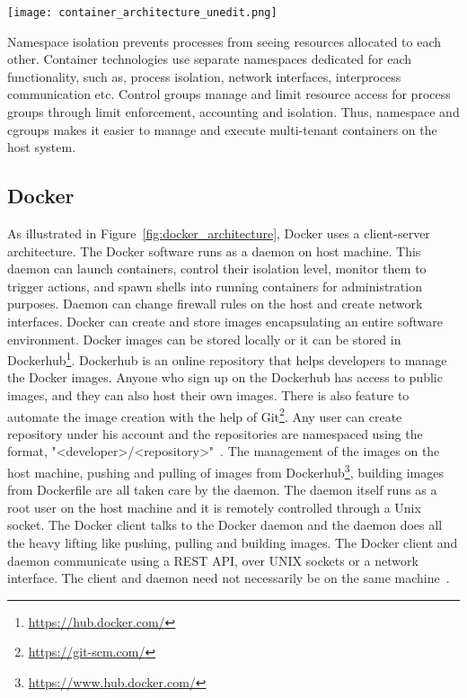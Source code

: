 \begin{center}
\texttt{[image: container\_architecture\_unedit.png]}
\label{fig:container_architecture}
\end{center}

Namespace isolation prevents processes from seeing resources allocated to each other. Container technologies use separate namespaces dedicated for each functionality, such as, process isolation, network interfaces, interprocess communication etc. Control groups manage and limit resource access for process groups through limit enforcement, accounting and isolation. Thus, namespace and cgroups makes it easier to manage and execute multi-tenant containers on the host system.

\subsection{Docker}
As illustrated in Figure~\ref{fig:docker_architecture}, Docker uses a client-server architecture. The Docker software runs as a daemon on host machine. This daemon can launch containers, control their isolation level, monitor them to trigger actions, and spawn shells into running containers for administration purposes. Daemon can change firewall rules on the host and create network interfaces. Docker can create and store images encapsulating an entire software environment. Docker images can be stored locally or it can be stored in Dockerhub\footnote{\url{https://hub.docker.com/}}. Dockerhub is an online repository that helps developers to manage the Docker images. Anyone who sign up on the Dockerhub has access to public images, and they can also host their own images. There is also feature to automate the image creation with the help of Git\footnote{\url{https://git-scm.com/}}. Any user can create repository under his account and the repositories are namespaced using the format, "\textless developer\textgreater/\textless repository\textgreater"~\cite{7742298}. The management of the images on the host machine, pushing and pulling of images from Dockerhub\footnote{\url{https://www.hub.docker.com/}}, building images from Dockerfile are all taken care by the daemon. The daemon itself runs as a root user on the host machine and it is remotely controlled through a Unix socket. The Docker client talks to the Docker daemon and the daemon does all the heavy lifting like pushing, pulling and building images. The Docker client and daemon communicate using a REST API, over UNIX sockets or a network interface. The client and daemon need not necessarily be on the same machine~\cite{docker-documentation}.

